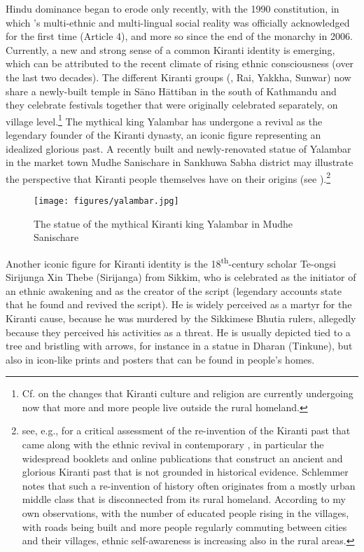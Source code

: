 Hindu dominance began to erode only recently, with the 1990 constitution, in which 's multi-ethnic and multi-lingual social reality was officially acknowledged for the first time (Article 4), and more so since the end of the monarchy in 2006. Currently, a new and strong sense of a common Kiranti identity is emerging, which can be attributed to the recent climate of rising ethnic consciousness (over the last two decades). The different Kiranti groups (, Rai, Yakkha, Sunwar) now share a newly-built temple in Sāno Hāttiban in the south of Kathmandu and they celebrate festivals together that were originally celebrated separately, on
village level.\footnote{Cf. \citet{Gaenszle_Redefining} on the changes that Kiranti culture and religion are currently undergoing now that more and more people live outside the rural homeland.}  The mythical king Yalambar has undergone a revival as the legendary founder of the Kiranti dynasty, an iconic figure representing an idealized glorious past. A recently built and newly-renovated statue of Yalambar in the market town Mudhe Sanischare in Sankhuwa Sabha district may illustrate the perspective that Kiranti people themselves have on their origins (see ).\footnote{see, e.g., \citet{Schlemmer2003_New} for a critical assessment of the re-invention of the Kiranti past that came along with the ethnic revival in contemporary , in particular the widespread booklets and online publications that construct an ancient and glorious Kiranti past that is not grounded in historical evidence. Schlemmer notes that such a re-invention of history often originates from a mostly urban middle class that is disconnected from its rural homeland. According to my own observations, with the number of educated people rising in the villages, with roads being built and more people regularly commuting between cities and their villages, ethnic self-awareness is increasing also in the rural areas.}

\begin{figure}
\centering
\texttt{[image: figures/yalambar.jpg]}
\caption{The statue of the mythical Kiranti king Yalambar in Mudhe Sanischare}\label{yalambar}
\end{figure}

\largerpage
Another iconic figure for Kiranti identity is the 18\textsuperscript{th}-century  scholar Te-ongsi Sirijunga Xin Thebe (Sirijanga) from Sikkim, who is celebrated as the initiator of an ethnic awakening and as the creator of the  script (legendary accounts state that he found and revived the script). He is widely perceived as a martyr for the Kiranti cause, because he was  murdered by the Sikkimese Bhutia rulers, allegedly because they perceived his activities as a threat. He is usually depicted tied to a tree and bristling with arrows, for instance in a statue in Dharan (Tinkune), but also in icon-like prints and posters that can be found in people's homes.


